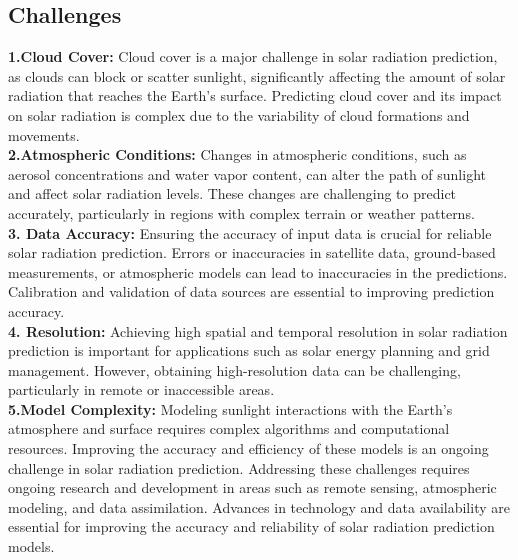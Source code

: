 \documentclass[12pt,a4paper]{report}
\begin{document}
\subsection{Challenges}
\textbf{1.Cloud Cover:} Cloud cover is a major challenge in solar radiation prediction, as 
clouds can block or scatter sunlight, significantly affecting the amount of solar radiation 
that reaches the Earth's surface. Predicting cloud cover and its impact on solar radiation 
is complex due to the variability of cloud formations and movements.\\
\textbf{2.Atmospheric Conditions:} Changes in atmospheric conditions, such as aerosol 
concentrations and water vapor content, can alter the path of sunlight and affect solar 
radiation levels. These changes are challenging to predict accurately, particularly in 
regions with complex terrain or weather patterns.\\
\textbf{3. Data Accuracy:} Ensuring the accuracy of input data is crucial for reliable solar 
radiation prediction. Errors or inaccuracies in satellite data, ground-based 
measurements, or atmospheric models can lead to inaccuracies in the predictions. 
Calibration and validation of data sources are essential to improving prediction 
accuracy.\\
\textbf{4. Resolution:} Achieving high spatial and temporal resolution in solar radiation 
prediction is important for applications such as solar energy planning and grid 
management. However, obtaining high-resolution data can be challenging, particularly 
in remote or inaccessible areas.\\
\textbf{5.Model Complexity:} Modeling sunlight interactions with the Earth's atmosphere and 
surface requires complex algorithms and computational resources. Improving the 
accuracy and efficiency of these models is an ongoing challenge in solar radiation 
prediction.
Addressing these challenges requires ongoing research and development in areas such as 
remote sensing, atmospheric modeling, and data assimilation. Advances in technology 
and data availability are essential for improving the accuracy and reliability of solar 
radiation prediction models.
\end{document}
